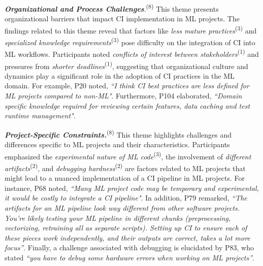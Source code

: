 

\textit{\textbf{Organizational and Process Challenges}}.\textsuperscript{(8)} 
This theme presents organizational barriers that impact CI implementation in ML
projects.
The findings related to this theme reveal that factors like \textit{less mature practices}\textsuperscript{(3)} and \textit{specialized knowledge requirements}\textsuperscript{(3)} pose difficulty on the integration of CI into ML workflows. Participants noted \textit{conflicts of interest between stakeholders}\textsuperscript{(1)} and pressures from \textit{shorter deadlines}\textsuperscript{(1)}, suggesting that organizational culture and dynamics play a significant role in the adoption of CI practices in the ML domain.
For example, P20 noted, \textit{``I think CI best practices are less defined for ML projects compared to non-ML"}. Furthermore, P104 elaborated, \textit{``Domain specific knowledge required for reviewing certain features, data caching and test runtime management"}.


\textit{\textbf{Project-Specific Constraints.}}\textsuperscript{(8)}
This theme highlights challenges and differences specific to ML projects and their characteristics.
Participants emphasized the \textit{experimental nature of ML code}\textsuperscript{(3)}, the involvement of \textit{different artifacts}\textsuperscript{(2)}, and \textit{debugging hardness}\textsuperscript{(2)} are factors related to ML projects that might lead to a nuanced implementation of a CI pipeline in ML projects.
For instance, P68 noted, \textit{``Many ML project code may be temporary and experimental, it would be costly to integrate a CI pipeline"}. 
In addition, P79 remarked, \textit{``The artifacts for an ML pipeline look way different from other software projects. You’re likely testing your ML pipeline in different chunks (preprocessing, vectorizing, retraining all as separate scripts). Setting up CI to ensure each of these pieces work independently, and their outputs are correct, takes a lot more focus''}. 
Finally, a challenge associated with debugging is elucidated by P83, who stated \textit{``you have to debug some hardware errors when working on ML projects''}.


